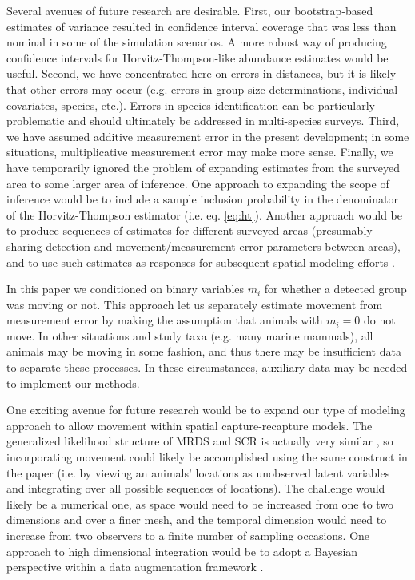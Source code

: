 \documentclass[12pt,fleqn]{article}
\begin{document}
Several avenues of future research are desirable.  First, our bootstrap-based estimates of variance resulted in confidence interval coverage that was less than nominal in some of the simulation scenarios.  A more robust way of producing confidence intervals for Horvitz-Thompson-like abundance estimates would be useful.  Second, we have concentrated here on errors in distances, but it is likely that other errors may occur (e.g. errors in group size determinations, individual covariates, species, etc.).  Errors in species identification can be particularly problematic \citep[see e.g.][]{ConnEtAl2014} and should ultimately be addressed in multi-species surveys.  Third, we have assumed additive measurement error in the present development; in some situations, multiplicative measurement error \citep[whereby animals further away are subject to greater measurement error;][]{BorchersEtAl2010} may make more sense.  Finally, we have temporarily ignored the problem of expanding estimates from the surveyed area to some larger area of inference.  One approach to expanding the scope of inference would be to include a sample inclusion probability in the denominator of the Horvitz-Thompson estimator (i.e. eq. \ref{eq:ht}).  Another approach would be to produce sequences of estimates for different surveyed areas (presumably sharing detection and movement/measurement error parameters between areas), and to use such estimates as responses for subsequent spatial modeling efforts \citep[see e.g.][]{MillerEtAl2013}.

In this paper we conditioned on binary variables $m_i$ for whether a detected group was moving or not. This approach let us separately estimate movement from measurement error by making the assumption that animals with $m_i=0$ do not move.  In other situations and study taxa (e.g. many marine mammals), all animals may be moving in some fashion, and thus there may be insufficient data to separate these processes.  In these circumstances, auxiliary data \citep[e.g. animals with known location to estimate measurement error; cf.][]{BorchersEtAl2010} may be needed to implement our methods.

One exciting avenue for future research would be to expand our type of modeling approach to allow movement within spatial capture-recapture \citep[SCR; see e.g.][]{BorchersEfford2008,RoyleEtAl2013book} models.  The generalized likelihood structure of MRDS and SCR is actually very similar \citep{BorchersEtAl2015,BorchersMarques2017}, so incorporating movement could likely be accomplished using the same construct in the paper (i.e. by viewing an animals' locations as unobserved latent variables and integrating over all possible sequences of locations).  The challenge would likely be a numerical one, as space would need to be increased from one to two dimensions and over a finer mesh, and the temporal dimension would need to increase from two observers to a finite number of sampling occasions.  One approach to high dimensional integration would be to adopt a Bayesian perspective within a data augmentation framework \citep{RoyleEtAl2007b,ConnEtAl2012}.
\end{document}
